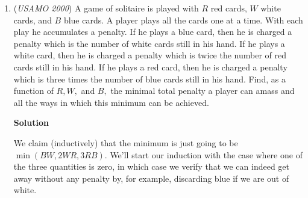 \begin{enumerate}
\textbf{Solution 2}

Let $A$, $B$, $C$ be the three angles of the triangle, then $r/AP = \tan{(A/2)}$, $r/BQ=\tan{(B/2)}$, and $r/CR=\tan{(C/2)}$. Without loss of generality, assume $A \leq B \leq C$, then $CR=min{(AP,BQ,CR)}$. Denote $x=\tan{(A/2)}$, $x=\tan{(B/2)}$, $z=\tan{(C/2)}$, then we have,
 \[5(x+y+z)- 3z=6 \qquad \qquad (1)\]Meanwhile,
 \[z = \tan{(C/2)} = \tan{(90- (A+B)/2))} = \frac{1-xy}{x+y}\]Substitute $z$ in $(1)$, we get
 \[5x^{2}+8xy+5y^{2} - 6x - 6y+2=0 \qquad \qquad (2)\]Treating (2) as a quadratic equation for $x$, the discriminant is:
 \[\Delta = (8y-6)^2 - 4*5(5y^2-6y+2)=-36y^2+24y-4 = -(6y-2)^2 \leq 0\]For $x$, $y$ to be both real numbers, $\Delta$ must not be negative, so $\Delta = 0$, which yields $y=1/3$. Solving for x, we get $x=\frac{-(8y-6)}{2*5}=1/3$. Using the formula $\tan(A)=\frac{2\tan(A/2)}{1-\tan^2(A/2)}$, we have $\tan(A)=\tan(B)=3/4$. Therefore $A=B=\arctan{(3/4)}$. This proves that all possible triangle $ABC$ are isosceles with the same set of angles, i.e., they are similar to each other. 

 It's inconsequential to the proof, but it can be easily found that, since $tan(A) = 3/4$, the altitude to the base of the isosceles triangle divides the triangle into two 3-4-5 right triangles with $4$ on the base; therefore, the entire triangle is 5-5-8. $\square$.

 Solution by $Mathdummy$.

 


	\item (\textit{USAMO 2000}) A game of solitaire is played with $R$ red cards, $W$ white cards, and $B$ blue cards. A player plays all the cards one at a time. With each play he accumulates a penalty. If he plays a blue card, then he is charged a penalty which is the number of white cards still in his hand. If he plays a white card, then he is charged a penalty which is twice the number of red cards still in his hand. If he plays a red card, then he is charged a penalty which is three times the number of blue cards still in his hand. Find, as a function of $R, W,$ and $B,$ the minimal total penalty a player can amass and all the ways in which this minimum can be achieved.


 



\textbf{Solution}

We claim (inductively) that the minimum is just going to be $\min(BW,2WR,3RB)$. We'll start our induction with the case where one of the three quantities is zero, in which case we verify that we can indeed get away without any penalty by, for example, discarding blue if we are out of white.


\end{enumerate}
